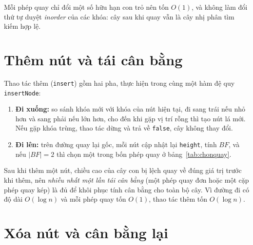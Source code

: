 Mỗi phép quay chỉ đổi một số hữu hạn con trỏ nên tốn $O(1)$, và không làm đổi
thứ tự duyệt \emph{inorder} của các khóa: cây sau khi quay vẫn là cây nhị phân
tìm kiếm hợp lệ.

\section{Thêm nút và tái cân bằng}\label{sec:avl-them}

Thao tác thêm (\texttt{insert}) gồm hai pha, thực hiện trong cùng một hàm đệ quy
\texttt{insertNode}:
\begin{enumerate}
  \item \textbf{Đi xuống:} so sánh khóa mới với khóa của nút hiện tại, đi sang trái
        nếu nhỏ hơn và sang phải nếu lớn hơn, cho đến khi gặp vị trí rỗng thì tạo
        nút lá mới. Nếu gặp khóa trùng, thao tác dừng và trả về \texttt{false}, cây
        không thay đổi.
  \item \textbf{Đi lên:} trên đường quay lại gốc, mỗi nút cập nhật lại \texttt{height},
        tính $BF$, và nếu $|BF| = 2$ thì chọn một trong bốn phép quay ở
        bảng~\ref{tab:chonquay}.
\end{enumerate}

Sau khi thêm một nút, chiều cao của cây con bị lệch quay về đúng giá trị trước khi
thêm, nên \emph{nhiều nhất một lần tái cân bằng} (một phép quay đơn hoặc một cặp
phép quay kép) là đủ để khôi phục tính cân bằng cho toàn bộ cây. Vì đường đi
có độ dài $O(\log n)$ và mỗi phép quay tốn $O(1)$, thao tác thêm tốn
$O(\log n)$.

\section{Xóa nút và cân bằng lại}\label{sec:avl-xoa}

